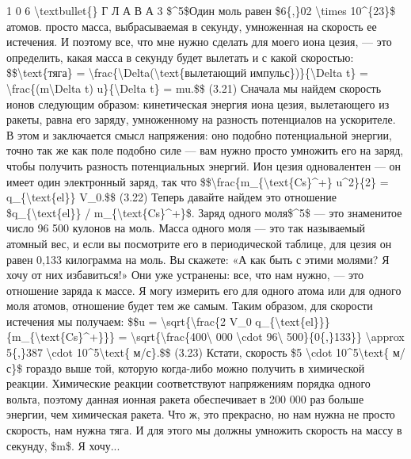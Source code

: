 \documentclass[10pt,oneside]{article}
\begin{document}
1 0 6 \textbackslash{}textbullet\{\} Г Л А В А  3 \$\textasciicircum{}5\$Один моль равен \$6\{,\}02 \textbackslash{}times 10\textasciicircum{}\{23\}\$ атомов. просто масса, выбрасываемая в секунду, умноженная на скорость ее истечения. И поэтому все, что мне нужно сделать для моего иона цезия, --- это определить, какая масса в секунду будет вылетать и с какой скоростью: \$\$\textbackslash{}text\{тяга\} = \textbackslash{}frac\{\textbackslash{}Delta(\textbackslash{}text\{вылетающий импульс\})\}\{\textbackslash{}Delta t\} = \textbackslash{}frac\{(m\textbackslash{}Delta t) u\}\{\textbackslash{}Delta t\} = mu.\$\$ (3.21) Сначала мы найдем скорость ионов следующим образом: кинетическая энергия иона цезия, вылетающего из ракеты, равна его заряду, умноженному на разность потенциалов на ускорителе. В этом и заключается смысл напряжения: оно подобно потенциальной энергии, точно так же как поле подобно силе --- вам нужно просто умножить его на заряд, чтобы получить разность потенциальных энергий. Ион цезия одновалентен --- он имеет один электронный заряд, так что \$\$\textbackslash{}frac\{m\_\{\textbackslash{}text\{Cs\}\textasciicircum{}+\} u\textasciicircum{}2\}\{2\} = q\_\{\textbackslash{}text\{el\}\} V\_0.\$\$ (3.22) Теперь давайте найдем это отношение \$q\_\{\textbackslash{}text\{el\}\} / m\_\{\textbackslash{}text\{Cs\}\textasciicircum{}+\}\$. Заряд одного моля\$\textasciicircum{}5\$ --- это знаменитое число 96 500 кулонов на моль. Масса одного моля --- это так называемый атомный вес, и если вы посмотрите его в периодической таблице, для цезия он равен 0,133 килограмма на моль. Вы скажете: «А как быть с этими молями? Я хочу от них избавиться!» Они уже устранены: все, что нам нужно, --- это отношение заряда к массе. Я могу измерить его для одного атома или для одного моля атомов, отношение будет тем же самым. Таким образом, для скорости истечения мы получаем: \$\$u = \textbackslash{}sqrt\{\textbackslash{}frac\{2 V\_0 q\_\{\textbackslash{}text\{el\}\}\}\{m\_\{\textbackslash{}text\{Cs\}\textasciicircum{}+\}\}\} = \textbackslash{}sqrt\{\textbackslash{}frac\{400\textbackslash{} 000 \textbackslash{}cdot 96\textbackslash{} 500\}\{0\{,\}133\}\} \textbackslash{}approx 5\{,\}387 \textbackslash{}cdot 10\textasciicircum{}5\textbackslash{}text\{ м/с\}.\$\$ (3.23) Кстати, скорость \$5 \textbackslash{}cdot 10\textasciicircum{}5\textbackslash{}text\{ м/с\}\$ гораздо выше той, которую когда-либо можно получить в химической реакции. Химические реакции соответствуют напряжениям порядка одного вольта, поэтому данная ионная ракета обеспечивает в 200 000 раз больше энергии, чем химическая ракета. Что ж, это прекрасно, но нам нужна не просто скорость, нам нужна тяга. И для этого мы должны умножить скорость на массу в секунду, \$m\$. Я хочу...\par
\end{document}
